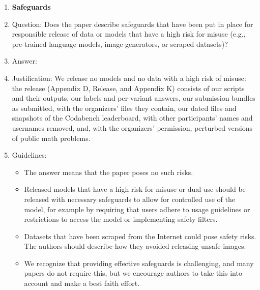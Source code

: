 \begin{enumerate}
\item {\bf Safeguards}
    \item[] Question: Does the paper describe safeguards that have been put in place for responsible release of data or models that have a high risk for misuse (e.g., pre-trained language models, image generators, or scraped datasets)?
    \item[] Answer: \answerNA{}
    \item[] Justification: We release no models and no data with a high risk of misuse: the release (Appendix D, Release, and Appendix K) consists of our scripts and their outputs, our labels and per-variant answers, our submission bundles as submitted, with the organizers' files they contain, our dated files and snapshots of the Codabench leaderboard, with other participants' names and usernames removed, and, with the organizers' permission, perturbed versions of public math problems.
    \item[] Guidelines:
    \begin{itemize}
        \item The answer \answerNA{} means that the paper poses no such risks.
        \item Released models that have a high risk for misuse or dual-use should be released with necessary safeguards to allow for controlled use of the model, for example by requiring that users adhere to usage guidelines or restrictions to access the model or implementing safety filters. 
        \item Datasets that have been scraped from the Internet could pose safety risks. The authors should describe how they avoided releasing unsafe images.
        \item We recognize that providing effective safeguards is challenging, and many papers do not require this, but we encourage authors to take this into account and make a best faith effort.
    \end{itemize}


\end{enumerate}
